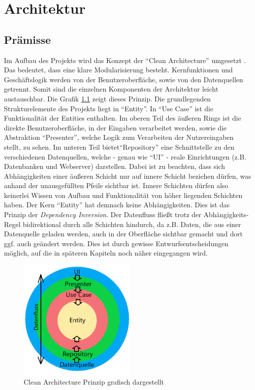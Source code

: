 \chapter{Architektur}

\section{Prämisse}
Im Aufbau des Projekts wird das Konzept der "`Clean Architecture"' umgesetzt \cite{CleanArchitecture} \cite{AndroidGuidelines}. Das bedeutet, dass eine klare Modularisierung besteht. Kernfunktionen und Geschäftslogik werden von der Benutzeroberfläche, sowie von den Datenquellen getrennt. Somit sind die einzelnen Komponenten der Architektur leicht austauschbar. 
Die Grafik \ref{cleanarch} zeigt dieses Prinzip. Die grundlegenden Strukturelemente des Projekts liegt in "`Entity"'. In "`Use Case"' ist die Funktionalität der Entities enthalten.  Im oberen Teil des äußeren Rings ist die direkte Benutzeroberfläche, in der Eingaben verarbeitet werden, sowie die Abstraktion "`Presenter"', welche Logik zum Verarbeiten der Nutzereingaben stellt, zu sehen. Im unteren Teil bietet"`Repository"' eine Schnittstelle zu den verschiedenen Datenquellen, welche - genau wie "`UI"' - reale Einrichtungen (z.B. Datenbanken und Webserver) darstellen.
Dabei ist zu beachten, dass sich Abhängigkeiten einer äußeren Schicht nur auf innere Schicht beziehen dürfen, was anhand der unausgefüllten Pfeile sichtbar ist. Innere Schichten dürfen also keinerlei Wissen von Aufbau und Funktionalität von höher liegenden Schichten haben. Der Kern "`Entity"' hat demnach keine Abhängigkeiten. Dies ist das Prinzip der {\em Dependency Inversion}.
Der Datenfluss fließt trotz der Abhängigkeits-Regel bidirektional durch alle Schichten hindurch, da z.B. Daten, die aus einer Datenquelle geladen werden, auch in der Oberfläche sichtbar gemacht und dort ggf. auch geändert werden. Dies ist durch gewisse Entwurfsentscheidungen möglich, auf die in späteren Kapiteln noch näher eingegangen wird.


\begin{figure}[H]
\centering
\includegraphics[width=0.51\textwidth]{pics/cleanArchitecture.png}%
\caption{Clean Architecture Prinzip grafisch dargestellt}%
\label{cleanarch}%
\end{figure}


